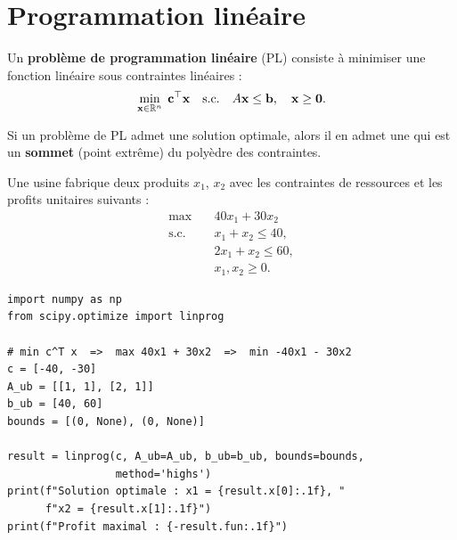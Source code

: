 \section{Programmation lin\'eaire}
\label{sec:pl}

\begin{definition}
Un \textbf{probl\`eme de programmation lin\'eaire} (PL) consiste \`a
minimiser une fonction lin\'eaire sous contraintes lin\'eaires :
\[
  \min_{\mathbf{x}\in\mathbb{R}^n}\;\mathbf{c}^\top\mathbf{x}
  \quad\text{s.c.}\quad
  A\mathbf{x}\leq\mathbf{b},\quad \mathbf{x}\geq\mathbf{0}.
\]
\end{definition}

\begin{theoreme}
Si un probl\`eme de PL admet une solution optimale, alors il en
admet une qui est un \textbf{sommet} (point extr\^eme) du poly\`edre
des contraintes.
\end{theoreme}

\begin{exemple}
Une usine fabrique deux produits $x_1$, $x_2$ avec les contraintes
de ressources et les profits unitaires suivants :
\begin{align*}
  \max\quad & 40x_1 + 30x_2 \\
  \text{s.c.}\quad & x_1 + x_2 \leq 40, \\
  & 2x_1 + x_2 \leq 60, \\
  & x_1, x_2 \geq 0.
\end{align*}
\end{exemple}

\begin{codeblock}[title=\textbf{Programmation lin\'eaire avec \texttt{scipy}}]
\begin{verbatim}
import numpy as np
from scipy.optimize import linprog

# min c^T x  =>  max 40x1 + 30x2  =>  min -40x1 - 30x2
c = [-40, -30]
A_ub = [[1, 1], [2, 1]]
b_ub = [40, 60]
bounds = [(0, None), (0, None)]

result = linprog(c, A_ub=A_ub, b_ub=b_ub, bounds=bounds,
                 method='highs')
print(f"Solution optimale : x1 = {result.x[0]:.1f}, "
      f"x2 = {result.x[1]:.1f}")
print(f"Profit maximal : {-result.fun:.1f}")
\end{verbatim}
\end{codeblock}

